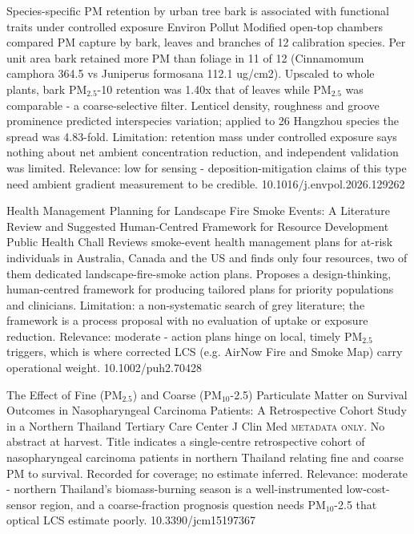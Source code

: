 \documentclass[10pt]{article}
\begin{document}
{Species-specific PM retention by urban tree bark is associated with functional traits under controlled exposure}
{Environ Pollut}
{Modified open-top chambers compared PM capture by bark, leaves and branches of 12 calibration species. Per unit area bark retained more PM than foliage in 11 of 12 (Cinnamomum camphora 364.5 vs Juniperus formosana 112.1 ug/cm2). Upscaled to whole plants, bark PM$_{2.5}$-10 retention was 1.40x that of leaves while PM$_{2.5}$ was comparable - a coarse-selective filter. Lenticel density, roughness and groove prominence predicted interspecies variation; applied to 26 Hangzhou species the spread was 4.83-fold. Limitation: retention mass under controlled exposure says nothing about net ambient concentration reduction, and independent validation was limited. Relevance: low for sensing - deposition-mitigation claims of this type need ambient gradient measurement to be credible.}
{10.1016/j.envpol.2026.129262}

{Health Management Planning for Landscape Fire Smoke Events: A Literature Review and Suggested Human-Centred Framework for Resource Development}
{Public Health Chall}
{Reviews smoke-event health management plans for at-risk individuals in Australia, Canada and the US and finds only four resources, two of them dedicated landscape-fire-smoke action plans. Proposes a design-thinking, human-centred framework for producing tailored plans for priority populations and clinicians. Limitation: a non-systematic search of grey literature; the framework is a process proposal with no evaluation of uptake or exposure reduction. Relevance: moderate - action plans hinge on local, timely PM$_{2.5}$ triggers, which is where corrected LCS (e.g. AirNow Fire and Smoke Map) carry operational weight.}
{10.1002/puh2.70428}

\par{}\baselineskip{}\baselineskip
{}

{The Effect of Fine (PM$_{2.5}$) and Coarse (PM$_{10}$-2.5) Particulate Matter on Survival Outcomes in Nasopharyngeal Carcinoma Patients: A Retrospective Cohort Study in a Northern Thailand Tertiary Care Center}
{J Clin Med}
{\textsc{metadata only.} No abstract at harvest. Title indicates a single-centre retrospective cohort of nasopharyngeal carcinoma patients in northern Thailand relating fine and coarse PM to survival. Recorded for coverage; no estimate inferred. Relevance: moderate - northern Thailand's biomass-burning season is a well-instrumented low-cost-sensor region, and a coarse-fraction prognosis question needs PM$_{10}$-2.5 that optical LCS estimate poorly.}
{10.3390/jcm15197367}
\end{document}
